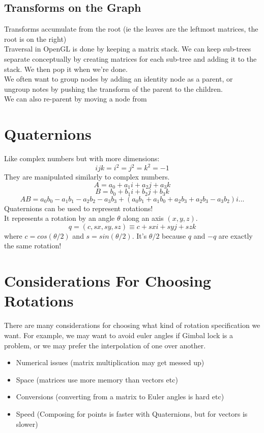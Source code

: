 \documentclass[12pt]{article}
\theoremstyle{definition}
\begin{document}
\subsection{Transforms on the Graph}
Transforms accumulate from the root (ie the leaves are the leftmost matrices, the root is on the right)
\\ \linebreak
Traversal in OpenGL is done by keeping a matrix stack. We can keep sub-trees separate conceptually by creating matrices for each sub-tree and adding it to the stack. We then pop it when we're done.
\\ \linebreak
We often want to group nodes by adding an identity node as a parent, or ungroup notes by pushing the transform of the parent to the children.
\\ \linebreak
We can also re-parent by moving a node from 
\section{Quaternions}
Like complex numbers but with more dimensions:
$$ ijk = i^2 = j^2 = k^2 = -1$$
They are manipulated similarly to complex numbers.
$$A = a_0 + a_1i + a_2j + a_3k$$
$$B = b_0 + b_1i + b_2j + b_3k$$
$$AB = a_0b_0 - a_1b_1 - a_2b_2 - a_3b_3 + (a_0b_1 + a_1b_0 + a_2b_3 + a_2b_3 - a_3b_2)i ...$$
Quaternions can be used to represent rotations!
\\ \linebreak
It represents a rotation by an angle $\theta$ along an axis $(x, y, z)$. $$q = (c, sx, sy, sz) \equiv c + sxi + syj + szk$$ where $c = cos(\theta/2)$ and $s = sin(\theta/2)$. It's $\theta/2$ because $q$ and $-q$ are exactly the same rotation! 

\section{Considerations For Choosing Rotations}
There are many considerations for choosing what kind of rotation specification we want. For example, we may want to avoid euler angles if Gimbal lock is a problem, or we may prefer the interpolation of one over another.
\\ \linebreak
\begin{itemize}
	\item Numerical issues (matrix multiplication may get messed up)
	\item Space (matrices use more memory than vectors etc)
	\item Conversions (converting from a matrix to Euler angles is hard etc)
	\item Speed (Composing for points is faster with Quaternions, but for 		vectors is slower)
	
\end{itemize}
\end{document}
